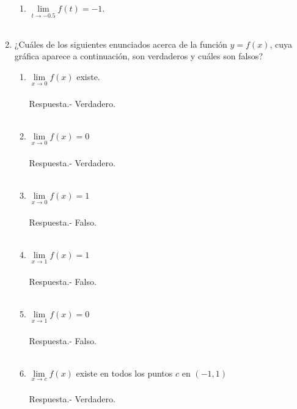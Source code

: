 \begin{enumerate}
\begin{enumerate}[\bfseries a)]
    \item $\lim\limits_{t\to -0.5} f(t) = -1$.\\\\

\end{enumerate}

\item ¿Cuáles de los siguientes enunciados acerca de la función $y = f(x)$, cuya gráfica aparece a continuación, son verdaderos y cuáles son falsos?
\begin{enumerate}[\bfseries a)]

    \item $\lim\limits_{x\to 0}f(x)$ existe.\\\\
	Respuesta.-\; Verdadero.\\\\

    \item $\lim\limits_{x\to 0}f(x) = 0$\\\\
	Respuesta.-\; Verdadero.\\\\

    \item $\lim\limits_{x\to 0}f(x) = 1$\\\\
	Respuesta.-\; Falso.\\\\

    \item $\lim\limits_{x\to 1}f(x) = 1$\\\\
	Respuesta.-\; Falso.\\\\

    \item $\lim\limits_{x\to 1}f(x) = 0$\\\\
	Respuesta.-\; Falso.\\\\

    \item $\lim\limits_{x\to c}f(x)$ existe en todos los puntos $c$ en $(-1,1)$\\\\
	Respuesta.-\; Verdadero.\\\\


\end{enumerate}
\end{enumerate}
